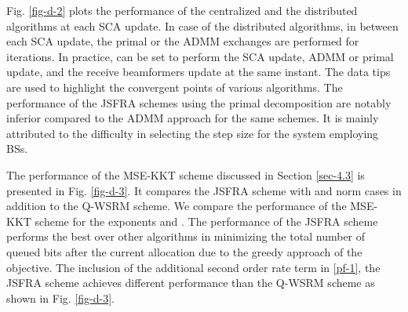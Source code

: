 Fig. \ref{fig-d-2} plots the performance of the centralized and the distributed algorithms at each \ac{SCA} update. In case of the distributed algorithms, in between each \ac{SCA} update, the primal or the \ac{ADMM} exchanges are performed for  iterations. In practice,  can be set to perform the \ac{SCA} update, \ac{ADMM} or primal update, and the receive beamformers  update at the same instant. The data tips are used to highlight the convergent points of various algorithms. The performance of the \ac{JSFRA} schemes using the primal decomposition are notably inferior compared to the \ac{ADMM} approach for the same schemes. It is mainly attributed to the difficulty in selecting the step size for the system employing  \acp{BS}.

The performance of the \ac{MSE}-\ac{KKT} scheme discussed in Section \ref{sec-4.3} is presented in Fig. \ref{fig-d-3}. It compares the \ac{JSFRA} scheme with  and  norm cases in addition to the \ac{Q-WSRM} scheme. We compare the performance of the \ac{MSE}-\ac{KKT} scheme for the exponents  and . The performance of the  \ac{JSFRA} scheme performs the best over other algorithms in minimizing the total number of queued bits after the current allocation due to the greedy approach of the objective. The inclusion of the additional second order rate term in \eqref{pf-1}, the  \ac{JSFRA} scheme achieves different performance than the \ac{Q-WSRM} scheme as shown in Fig. \ref{fig-d-3}.

